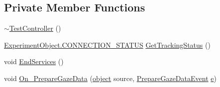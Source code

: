 \subsection*{Private Member Functions}
\begin{DoxyCompactItemize}
\item 
\hyperlink{class_web_analyzer_1_1_controller_1_1_test_controller_a9404350d73eb0d40751b1bdee5171b71}{$\sim$\+Test\+Controller} ()
\item 
\hyperlink{class_web_analyzer_1_1_u_i_1_1_interaction_objects_1_1_experiment_object_a2875208b4f4b0ed643593152f4ec025c}{Experiment\+Object.\+C\+O\+N\+N\+E\+C\+T\+I\+O\+N\+\_\+\+S\+T\+A\+T\+U\+S} \hyperlink{class_web_analyzer_1_1_controller_1_1_test_controller_aef58517bbc760e87c541cc4b0272957c}{Get\+Tracking\+Status} ()
\item 
void \hyperlink{class_web_analyzer_1_1_controller_1_1_test_controller_af7260e39f8963732f38631dd618da497}{End\+Services} ()
\item 
void \hyperlink{class_web_analyzer_1_1_controller_1_1_test_controller_a61584d87704fffabf4ff0f8c04b33407}{On\+\_\+\+Prepare\+Gaze\+Data} (\hyperlink{_u_i_2_h_t_m_l_resources_2js_2lib_2underscore_8min_8js_aae18b7515bb2bc4137586506e7c0c903}{object} source, \hyperlink{class_web_analyzer_1_1_events_1_1_prepare_gaze_data_event}{Prepare\+Gaze\+Data\+Event} \hyperlink{_u_i_2_h_t_m_l_resources_2js_2lib_2bootstrap_8min_8js_ab5902775854a8b8440bcd25e0fe1c120}{e})
\end{DoxyCompactItemize}
